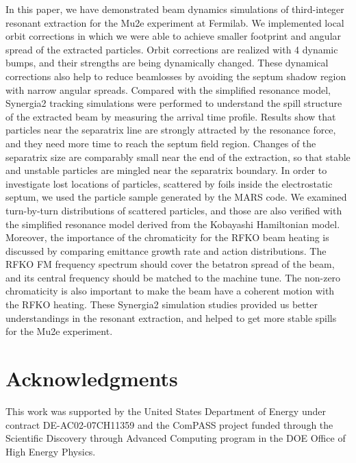 \documentclass[review,1p,number,fleqn,a4paper]{elsarticle}
\begin{document}
In this paper, we have demonstrated beam dynamics simulations of third-integer resonant extraction for the Mu2e experiment at Fermilab. We implemented local orbit corrections in which we were able to achieve smaller footprint and angular spread of the extracted particles. Orbit corrections are realized with 4 dynamic bumps, and their strengths are being dynamically changed. These dynamical corrections also help to reduce beamlosses by avoiding the septum shadow region with narrow angular spreads. Compared with the simplified resonance model, Synergia2 tracking simulations were performed to understand the spill structure of the extracted beam by measuring the arrival time profile. Results show that particles near the separatrix line are strongly attracted by the resonance force, and they need more time to reach the septum field region. Changes of the separatrix size are comparably small near the end of the extraction, so that stable and unstable particles are mingled near the separatrix boundary. In order to investigate lost locations of particles, scattered by foils inside the electrostatic septum, we used the particle sample generated by the MARS code. We examined turn-by-turn distributions of scattered particles, and those are also verified with the simplified resonance model derived from the Kobayashi Hamiltonian model. Moreover, the importance of the chromaticity for the RFKO beam heating is discussed by comparing emittance growth rate and action distributions. The RFKO FM frequency spectrum should cover the betatron spread of the beam, and its central frequency should be matched to the machine tune. The non-zero chromaticity is also important to make the beam have a coherent motion with the RFKO heating. These Synergia2 simulation studies provided us better understandings in the resonant extraction, and helped to get more stable spills for the Mu2e experiment.



\section{\label{thanks}Acknowledgments}

This work was supported by the United States Department of Energy under contract DE-AC02-07CH11359 and the ComPASS project funded through the Scientific Discovery through Advanced Computing program in the DOE Office of High Energy Physics.
\end{document}
